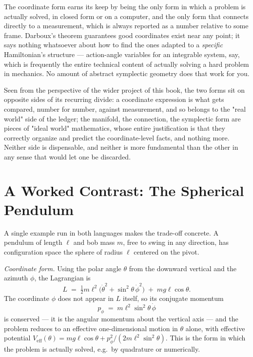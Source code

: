 The coordinate form earns its keep by being the only form in which a
problem is actually solved, in closed form or on a computer, and the
only form that connects directly to a measurement, which is always
reported as a number relative to some frame. Darboux's theorem
guarantees good coordinates exist near any point; it says nothing
whatsoever about how to find the ones adapted to a \emph{specific}
Hamiltonian's structure --- action-angle variables for an integrable
system, say, which is frequently the entire technical content of
actually solving a hard problem in mechanics. No amount of abstract
symplectic geometry does that work for you.

Seen from the perspective of the wider project of this book, the two
forms sit on opposite sides of its recurring divide: a coordinate
expression is what gets compared, number for number, against
measurement, and so belongs to the "real world" side of the ledger;
the manifold, the connection, the symplectic form are pieces of
"ideal world" mathematics, whose entire justification is that they
correctly organize and predict the coordinate-level facts, and
nothing more. Neither side is dispensable, and neither is more
fundamental than the other in any sense that would let one be
discarded.

\section{A Worked Contrast: The Spherical Pendulum}

A single example run in both languages makes the trade-off concrete.
A pendulum of length $\ell$ and bob mass $m$, free to swing in any
direction, has configuration space the sphere of radius $\ell$
centered on the pivot.

\emph{Coordinate form.} Using the polar angle $\theta$ from the
downward vertical and the azimuth $\phi$, the Lagrangian is
\begin{equation}
  L \;=\; \tfrac12 m\ell^2\bigl(\dot\theta^2 + \sin^2\theta\,
  \dot\phi^2\bigr) \;+\; mg\ell\cos\theta .
  \label{eq:sph-pendulum-L}
\end{equation}
The coordinate $\phi$ does not appear in $L$ itself, so its conjugate
momentum
\begin{equation}
  p_\phi \;=\; m\ell^2\sin^2\theta\,\dot\phi
  \label{eq:sph-pendulum-pphi}
\end{equation}
is conserved --- it is the angular momentum about the vertical axis
--- and the problem reduces to an effective one-dimensional motion in
$\theta$ alone, with effective potential $V_{\mathrm{eff}}(\theta) =
mg\ell\cos\theta + p_\phi^2/(2m\ell^2\sin^2\theta)$. This is the form
in which the problem is actually solved, e.g.\ by quadrature or
numerically.

